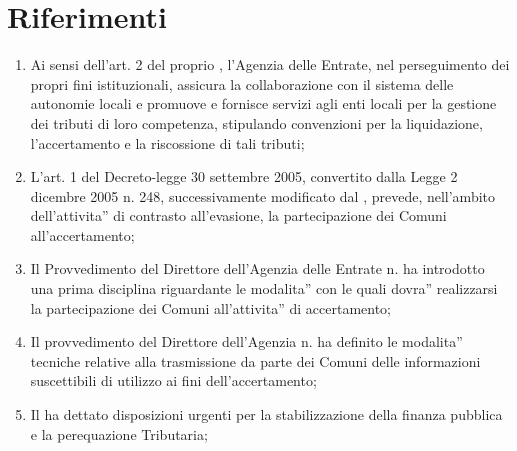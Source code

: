 \documentclass[a4paper,14pt,italian]{sphinxmanual}
\begin{document}
\section{Riferimenti}
\label{\detokenize{tributi:riferimenti}}\begin{enumerate}
\def\theenumi{\arabic{enumi}}
\def\labelenumi{\theenumi .}
\makeatletter\def\p@enumii{\p@enumi \theenumi .}\makeatother
\item {} 
Ai sensi dell’art. 2 del proprio , l’Agenzia delle Entrate, nel perseguimento dei propri fini istituzionali, assicura la collaborazione con il sistema delle autonomie locali e promuove e fornisce servizi agli enti locali per la gestione dei tributi di loro competenza, stipulando convenzioni per la liquidazione, l’accertamento e la riscossione di tali tributi;

\item {} 
L’art. 1 del Decreto-legge 30 settembre 2005, convertito dalla Legge 2 dicembre 2005 n. 248, successivamente modificato dal , prevede, nell’ambito dell’attivita” di contrasto all’evasione, la partecipazione dei Comuni all’accertamento;

\item {} 
Il Provvedimento del Direttore dell’Agenzia delle Entrate n.  ha introdotto una prima disciplina riguardante le modalita” con le quali dovra” realizzarsi la partecipazione dei Comuni all’attivita” di accertamento;

\item {} 
Il provvedimento del Direttore dell’Agenzia n.  ha definito le modalita” tecniche relative alla trasmissione da parte dei Comuni delle informazioni suscettibili di utilizzo ai fini dell’accertamento;

\item {} 
Il  ha dettato disposizioni urgenti per la stabilizzazione della finanza pubblica e la perequazione Tributaria;

\end{enumerate}
\end{document}
